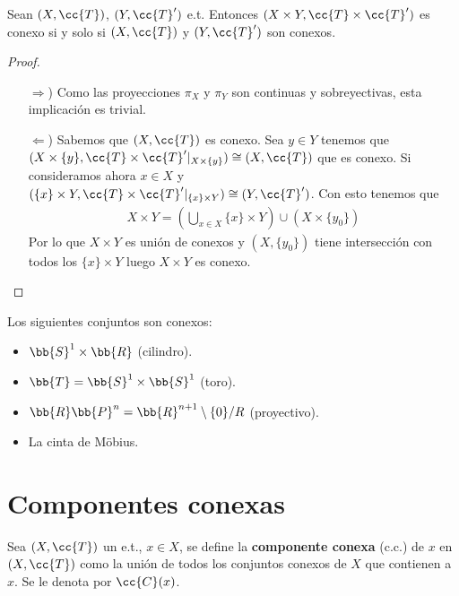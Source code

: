 \begin{prop}
    Sean $(X, \cc{T})$, $(Y, \cc{T}')$ e.t. Entonces $(X\times Y, \cc{T}\times \cc{T}')$ es conexo si y solo si $(X, \cc{T})$ y $(Y, \cc{T}')$ son conexos.
    \begin{proof}\
        \begin{itemize}
            \item[$\Rightarrow$)] Como las proyecciones $\pi_X$ y $\pi_Y$ son continuas y sobreyectivas, esta implicación es trivial.
            \item[$\Leftarrow$)] Sabemos que $(X, \cc{T})$ es conexo. Sea $y\in Y$ tenemos que $(X\times \{y\}, \cc{T}\times \cc{T}'|_{X\times\{y\}})\cong (X, \cc{T})$ que es conexo. Si consideramos ahora $x\in X$ y  $(\{x\}\times Y, \cc{T}\times \cc{T}'|_{\{x\}\times Y})\cong (Y, \cc{T}')$. Con esto tenemos que
            \begin{align*}
                X\times Y = \left(\bigcup\limits_{x\in X}\{x\}\times Y\right) \cup \left(X \times \{y_0\}\right)
            \end{align*}
            Por lo que $X\times Y$ es unión de conexos y $(X, \{y_0\})$ tiene intersección con todos los $\{x\}\times Y$ luego $X\times Y$ es conexo.

        \end{itemize}
    \end{proof}
\end{prop}

\begin{ejemplo}
    Los siguientes conjuntos son conexos:
    \begin{itemize}
        \item $\bb{S}^1 \times \bb{R}$ (cilindro).
        \item $\bb{T}=\bb{S}^1 \times \bb{S}^1$ (toro).
        \item $\bb{R}\bb{P}^n = \bb{R}^{n+1}\setminus \{0\}/R$ (proyectivo).
        \item La cinta de Möbius.
    \end{itemize}
    \endsquare
\end{ejemplo}

\section{Componentes conexas}
\begin{definicion}
    Sea $(X, \cc{T})$ un e.t., $x\in X$, se define la \textbf{componente conexa} (c.c.) de $x$ en $(X, \cc{T})$ como la unión de todos los conjuntos conexos de $X$ que contienen a $x$. Se le denota por $\cc{C}(x)$.
    \endsquare
\end{definicion}

